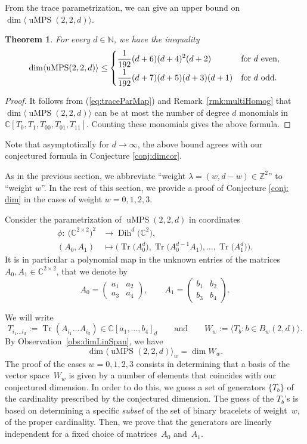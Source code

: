 \documentclass[pdftex]{sigma}
\numberwithin{equation}{section}
\newtheorem{Theorem}{Theorem}[section]
\DeclareMathOperator{\Tr}{Tr}
\newcommand{\ZZ}{\mathbb{Z}}
\newcommand{\CC}{\mathbb{C}}
\DeclareMathOperator{\uMPS}{uMPS}
\DeclareMathOperator{\Dih}{Dih}
\begin{document}
From the trace parametrization, we can give an upper bound on $\dim \langle \uMPS(2,2,d) \rangle$.

\begin{Theorem}
For every $d \in {\mathbb N}$, we have the inequality
\[   \dim \langle \uMPS(2,2,d) \rangle \leq
\begin{cases}
      \displaystyle  \frac{1}{192}(d + 6)(d + 4)^2(d + 2) & \text{for $d$ even}, \vspace{1mm}\\
     \displaystyle   \frac{1}{192}(d + 7)(d + 5)(d + 3)(d + 1) & \text{for $d$ odd}.
    \end{cases}
\]
\end{Theorem}
\begin{proof}
    It follows from (\ref{eq:traceParMap}) and Remark~\ref{rmk:multiHomog} that $\dim \langle \uMPS(2,2,d) \rangle$ can be at most the number of degree $d$ monomials in $\CC[T_0,T_1,T_{00},T_{01},T_{11}]$. Counting these monomials gives the above formula.
\end{proof}

Note that asymptotically for $d \to \infty$, the above bound agrees with our conjectured formula in Conjecture \ref{conj:dimcor}.

As in the previous section, we abbreviate ``weight $\lambda=(w,d-w)\in \ZZ^2$'' to ``weight $w$''. In the rest of this section, we provide a proof of Conjecture \ref{conj: dim} in the cases of weight $w=0,1,2,3$.

Consider the parametrization of $\uMPS(2,2,d)$ in coordinates
\begin{align*}
\phi\colon \ \big({\mathbb C}^{2\times 2}\big)^2 &\to \Dih^d\big({\mathbb C}^2\big),\\
(A_0,A_1) & \mapsto \big(\Tr\big(A_0^d\big),\Tr\big(A_0^{d-1}A_1\big),\dots,\Tr\big(A_1^d\big)\big).
\end{align*}
It is in particular a polynomial map in the unknown entries of the matrices $A_0,A_1\in {\mathbb C}^{2\times 2}$, that we denote by
\[
A_0=
\begin{pmatrix}
a_1 & a_2 \\
a_3 & a_4
\end{pmatrix}, \qquad
A_1=
\begin{pmatrix}
b_1 & b_2 \\
b_3 & b_4
\end{pmatrix}.
\]

We will write
\[
T_{i_1 \dots i_d}:=\Tr(A_{i_1}\dots A_{i_d}) \in {\mathbb C}[a_1,\dots,b_4]_d \qquad \text{and} \qquad  W_w := \langle T_b\colon b\in B_w(2,d)\rangle.
\]
By Observation~\ref{obs:dimLinSpan}, we have
\[
\dim \langle \uMPS(2,2,d)\rangle_w= \dim W_w.
\]
The proof of the cases $w=0,1,2,3$ consists in determining that a basis of the vector space~$W_w$ is given by a number of elements that coincides with our conjectured dimension. In order to do this, we guess a set of generators $\{T_b\}$ of the cardinality prescribed by the conjectured dimension. The guess of the $T_b$'s is based on determining a specific \textit{subset} of the set of binary bracelets of weight~$w$, of the proper cardinality. Then, we prove that the generators are linearly independent for a fixed choice of matrices~$A_0$ and~$A_1$.%
\end{document}

